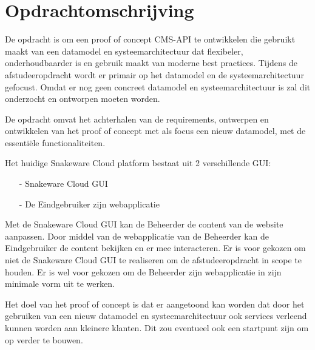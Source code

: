 \section{Opdrachtomschrijving}
\label{sec:Opdrachtomschrijving}
De opdracht is om een proof of concept CMS-API te ontwikkelen die gebruikt maakt van een datamodel en systeemarchitectuur dat flexibeler, onderhoudbaarder is en gebruik maakt van moderne best practices.
Tijdens de afstudeeropdracht wordt er primair op het datamodel en de systeemarchitectuur gefocust.
Omdat er nog geen concreet datamodel en systeemarchitectuur is zal dit onderzocht en ontworpen moeten worden.

\whitespace[2]
De opdracht omvat het achterhalen van de requirements, ontwerpen en ontwikkelen van het proof of concept met als focus een nieuw datamodel, met de essentiële functionaliteiten.

\whitespace[2]
Het huidige Snakeware Cloud platform bestaat uit 2 verschillende \gls{GUI}:
\begin{itemize}
	\item[-] Snakeware Cloud \gls{GUI}
    \item[-] De \gls{Eindgebruiker} zijn webapplicatie
\end{itemize}

\whitespace
Met de Snakeware Cloud \gls{GUI} kan de \gls{Beheerder} de content van de website aanpassen.
Door middel van de webapplicatie van de \gls{Beheerder} kan de \gls{Eindgebruiker} de content bekijken en er mee interacteren.
Er is voor gekozen om niet de Snakeware Cloud \gls{GUI} te realiseren om de afstudeeropdracht in scope te houden.
Er is wel voor gekozen om de \gls{Beheerder} zijn webapplicatie in zijn minimale vorm uit te werken.

\whitespace[2]
Het doel van het proof of concept is dat er aangetoond kan worden dat door het gebruiken van een nieuw datamodel en systeemarchitectuur ook services verleend kunnen worden aan kleinere klanten.
Dit zou eventueel ook een startpunt zijn om op verder te bouwen.
%
